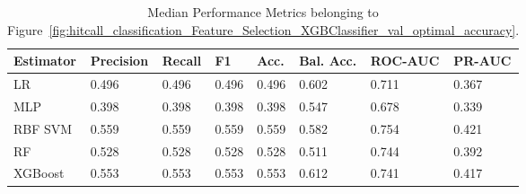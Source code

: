 \begin{longtable}{llllllll}
\caption{Median Performance Metrics belonging to Figure~\ref{fig:hitcall_classification_Feature_Selection_XGBClassifier_val_optimal_accuracy}.}\label{tab:table:hitcall_classification_feature_selection_xgbclassifier_val_optimal_accuracy}\\
\toprule
\midrule
\small Estimator & \small Precision & \small Recall & \small F1 & \small Acc. & \small Bal. Acc. & \small ROC-AUC & \small PR-AUC\\
\hline
LR & 0.496 & 0.496 & 0.496 & 0.496 & 0.602 & 0.711 & 0.367\\
MLP & 0.398 & 0.398 & 0.398 & 0.398 & 0.547 & 0.678 & 0.339\\
RBF SVM & 0.559 & 0.559 & 0.559 & 0.559 & 0.582 & 0.754 & 0.421\\
RF & 0.528 & 0.528 & 0.528 & 0.528 & 0.511 & 0.744 & 0.392\\
XGBoost & 0.553 & 0.553 & 0.553 & 0.553 & 0.612 & 0.741 & 0.417\\
\bottomrule
\end{longtable}